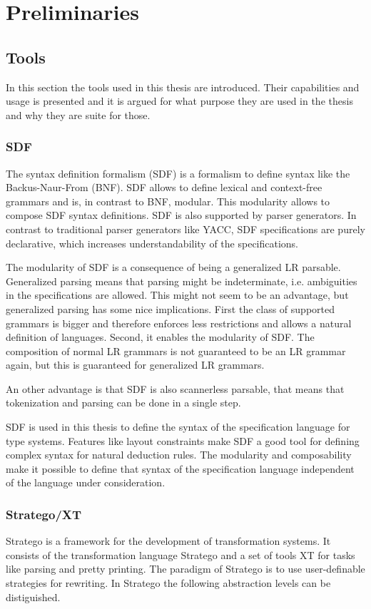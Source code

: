 
\chapter{Preliminaries}
\section{Tools}
In this section the tools used in this thesis are introduced. Their
capabilities and usage is presented and it is argued for what purpose
they are used in the thesis and why they are suite for those.
\subsection{SDF}
The syntax definition formalism (SDF) is a formalism to define syntax
like the Backus-Naur-From (BNF). SDF allows to define lexical and
context-free grammars and is, in contrast to BNF, modular. This
modularity allows to compose SDF syntax definitions. SDF is also
supported by parser generators. In contrast to traditional parser
generators like YACC, SDF specifications are purely declarative, which
increases understandability of the specifications.

The modularity of SDF is a consequence of being a generalized LR
parsable. Generalized parsing means that parsing might be
indeterminate, i.e. ambiguities in the specifications are
allowed. This might not seem to be an advantage, but generalized
parsing has some nice implications. First the class of supported
grammars is bigger and therefore enforces less restrictions and allows
a natural definition of languages. Second, it enables the modularity
of SDF. The composition of normal LR grammars is not guaranteed to be
an LR grammar again, but this is guaranteed for generalized LR
grammars.

An other advantage is that SDF is also scannerless parsable, that
means that tokenization and parsing can be done in a single step.


SDF is used in this thesis to define the syntax of the specification
language for type systems. Features like layout constraints make SDF a
good tool for defining complex syntax for natural deduction rules. The
modularity and composability make it possible to define that syntax of
the specification language independent of the language under
consideration.
\subsection{Stratego/XT}
Stratego is a framework for the development of transformation
systems. It consists of the transformation language Stratego and a set
of tools XT for tasks like parsing and pretty printing. The paradigm
of Stratego is to use user-definable strategies for
rewriting. In Stratego the following abstraction levels can be
distiguished.

